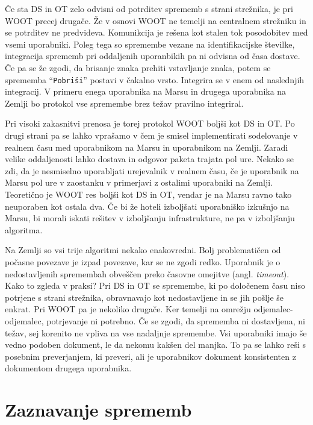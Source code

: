\documentclass[a4paper, 12pt, twoside]{book}
\begin{document}
Če sta DS in OT zelo odvisni od potrditev sprememb s strani strežnika, je pri WOOT precej drugače. Že v osnovi WOOT ne temelji na centralnem strežniku in se potrditev ne predvideva. Komunikcija je rešena kot stalen tok posodobitev med vsemi uporabniki. Poleg tega so spremembe vezane na identifikacijske številke, integracija sprememb pri oddaljenih uporanbikih pa ni odvisna od časa dostave. Če pa se že zgodi, da brisanje znaka prehiti vstavljanje znaka, potem se sprememba “{\tt Pobriši}” postavi v čakalno vrsto. Integrira se v enem od naslednjih integracij. V primeru enega uporabnika na Marsu in drugega uporabnika na Zemlji bo protokol vse spremembe brez težav pravilno integriral.

Pri visoki zakasnitvi prenosa je torej protokol WOOT boljši kot DS in OT. Po drugi strani pa se lahko vprašamo v čem je smisel implementirati sodelovanje v realnem času med uporabnikom na Marsu in uporabnikom na Zemlji. Zaradi velike oddaljenosti lahko dostava in odgovor paketa trajata pol ure. Nekako se zdi, da je nesmiselno uporabljati urejevalnik v realnem času, če je uporabnik na Marsu pol ure v zaostanku v primerjavi z ostalimi uporabniki na Zemlji. Teoretično je WOOT res boljši kot DS in OT, vendar je na Marsu ravno tako neuporaben kot ostala dva. Če bi že hoteli izboljšati uporabniško izkušnjo na Marsu, bi morali iskati rešitev v izboljšanju infrastrukture, ne pa v izboljšanju algoritma.

Na Zemlji so vsi trije algoritmi nekako enakovredni. Bolj problematičen od počasne povezave je izpad povezave, kar se ne zgodi redko. Uporabnik je o nedostavljenih spremembah obveščen preko časovne omejitve (angl. \textit{timeout}). Kako to zgleda v praksi? Pri DS in OT se spremembe, ki po določenem času niso potrjene s strani strežnika, obravnavajo kot nedostavljene in se jih pošlje še enkrat. Pri WOOT pa je nekoliko drugače. Ker temelji na omrežju odjemalec-odjemalec, potrjevanje ni potrebno. Če se zgodi, da sprememba ni dostavljena, ni težav, sej korenito ne vpliva na vse nadaljnje spremembe. Vsi uporabniki imajo še vedno podoben dokument, le da nekomu kakšen del manjka. To pa se lahko reši s posebnim preverjanjem, ki preveri, ali je uporabnikov dokument konsistenten z dokumentom drugega uporabnika.

\section{Zaznavanje sprememb}
\end{document}
